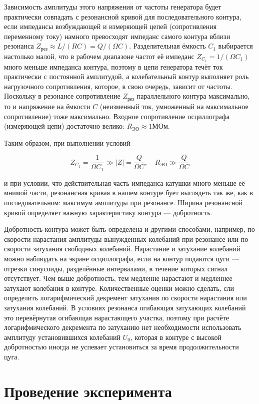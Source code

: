 \documentclass[12pt,a4paper]{scrartcl}
\begin{document}
	Зависимость амплитуды этого напряжения от частоты генератора будет практически совпадать с резонансной кривой для последовательного контура, если импедансы возбуждающей и измеряющей цепей (сопротивления переменному току) намного превосходят импеданс самого контура вблизи резонанса $Z_\text{рез} \approx L / (RC) = Q / (\Omega C)$. Разделительная ёмкость $C_1$ выбирается настолько малой, что в рабочем диапазоне частот её импеданс $Z_{C_1} = 1/(\Omega C_1)$ много меньше импеданса контура, поэтому в цепи генератора течёт ток практически с постоянной амплитудой, а колебательный контур выполняет роль нагрузочного сопротивления, которое, в свою очередь, зависит от частоты. Поскольку в резонансе сопротивление $Z_\text{рез}$ параллельного контура максимально, то и напряжение на ёмкости $C$ (неизменный ток, умноженный на максимальное сопротивление) тоже максимально. Входное сопротивление осциллографа (измеряющей цепи) достаточно велико: $R_\text{ЭО} \approx 1 \text{МОм}$.
	
	Таким образом, при выполнении условий

	$$Z_{C_1} = \frac{1}{\Omega C_1} \gg |Z| = \frac{Q}{\Omega C}, \quad R_\text{ЭО} \gg \frac{Q}{\Omega C}$$
	
	и при условии, что действительная часть импеданса катушки много меньше её мнимой части, резонансная кривая в нашем контуре бует выглядеть так же, как в последовательном: максимум амплитуды при резонансе. Ширина резонансной кривой определяет важную характеристику контура --- добротность.
	
	Добротность контура может быть определена и другими способами, например, по скорости нарастания амплитуды вынужденных колебаний при резонансе или по скорости затухания свободных колебаний. Нарастание и затухание колебаний можно наблюдать на экране осциллографа, если на контур подаются цуги --- отрезки синусоиды, разделённые интервалами, в течение которых сигнал отсутствует. Чем выше добротность, тем медленне нарастают и медленнее затухают колебания в контуре. Количественные оценки можно сделать, сли определить логарифмический декремент затухания по скорости нарастания или затухания колебаний. В условиях резонанса огибающая затухающих колебаний это перевёрнутая огибающая нарастающего участка, поэтому при расчёте логарифмического декремента по затуханию нет необходимости использовать амплитуду установившихся колебаний $U_0$, которая в контуре с высокой добротностью иногда не успевает установиться за время продолжительности цуга.
	
	
	\section{Проведение эксперимента}
	
\end{document}
